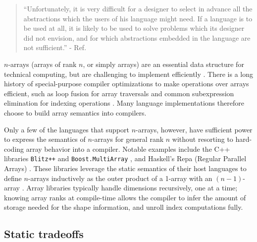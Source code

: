 \documentclass[preprint]{sigplanconf}
\newcommand{\code}[1]{\texttt{#1}}
\begin{document}
\begin{quotation}
``Unfortunately, it is very difficult for a designer to select in advance all
the abstractions which the users of his language might need. If a language is
to be used at all, it is likely to be used to solve problems which its
designer did not envision, and for which abstractions embedded in the language
are not sufficient.'' - Ref. \cite{Liskov:1974pb}
\end{quotation}

$n$-arrays (arrays of rank $n$, or simply arrays) are an essential data
structure for technical computing, but are challenging to implement
efficiently \cite{Sattley:1960as,Sattley:1961as,Randell:1964a6}. There is a
long history of special-purpose compiler optimizations to make operations over
arrays efficient, such as loop fusion for array traversals and common
subexpression elimination for indexing operations \cite{Randell:1964a6,
Busam:1969oe}. Many language implementations therefore choose to build array
semantics into compilers.

Only a few of the languages that support $n$-arrays, however, have sufficient
power to express the semantics of $n$-arrays for general rank $n$ without
resorting to hard-coding array behavior into a compiler.
Notable examples include the C++ libraries 
\code{Blitz++} \cite{Veldhuizen:1998ab} and \code{Boost.MultiArray}
\cite{Garcia:2005ma}, and Haskell's Repa (Regular Parallel Arrays)
\cite{Keller:2010rs,Lippmeier:2011ep, Lippmeier:2012gp}. These libraries
leverage the static semantics of their host languages to
define $n$-arrays inductively as the outer product of a 1-array with an
$(n-1)$-array \cite{Bavestrelli:2000ct}.
Array libraries typically handle dimensions recursively, one at a time;
knowing array ranks at compile-time allows the compiler to infer the amount
of storage needed for the shape information, and unroll index computations fully.


\subsection{Static tradeoffs}
\end{document}
